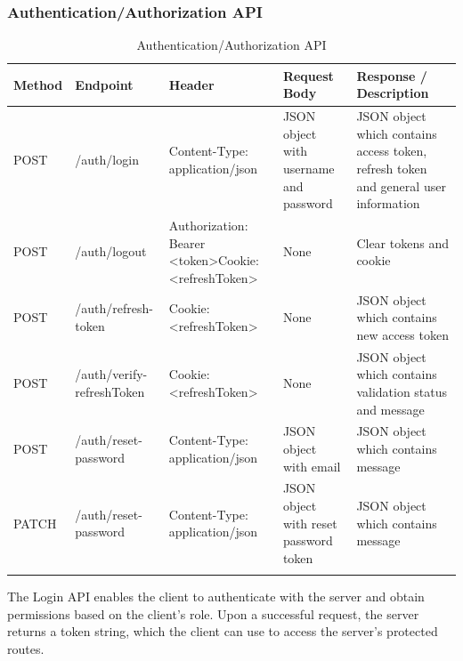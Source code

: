 	
	

	\newpage 
	\subsubsection{Authentication/Authorization API}
	\begin{longtable}{|m{1.5cm}|m{4.8cm}|m{3.3cm}|m{3cm}|m{3.2cm}|}
		\hline
		\textbf{Method} & \textbf{Endpoint} & \textbf{Header}                                                                                                                            & \textbf{Request Body} & \textbf{Response / Description}   \\ \hline
		\endhead
		
		POST & /auth/login & Content-Type: application/json & JSON object with username and password & JSON object which contains access token, refresh token and general user information \\ \hline
		
		POST & /auth/logout & Authorization: Bearer <token>\newline Cookie: \newline <refreshToken> & None  & Clear tokens and cookie \\ \hline
		
		POST & /auth/refresh-token & Cookie: \newline <refreshToken>& None & JSON object which contains new access token \\ \hline
		
		POST & /auth/verify-refreshToken & Cookie: \newline <refreshToken>& None & JSON object which contains validation status and message \\ \hline
		
		POST & /auth/reset-password &  Content-Type: application/json &  JSON object with email  &  JSON object which contains message \\ \hline
		
		PATCH & /auth/reset-password &  Content-Type: application/json &  JSON object with reset password token &  JSON object which contains message \\ \hline
		
		
		\caption{Authentication/Authorization API}
		\label{tab:auth-api}
		
	\end{longtable}
	
	
The Login API enables the client to authenticate with the server and obtain permissions based on the client’s role. Upon a successful request, the server returns a token string, which the client can use to access the server's protected routes.

